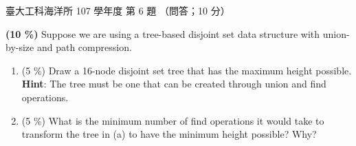 \begin{pastexam}[label={px:ntu-107-esoe-ds-06}]{臺大工科海洋所 107 學年度 第 6 題}
（問答；10 分）

\textbf{(10 \%)} Suppose we are using a tree-based disjoint set data structure with union-by-size and
path compression.
\begin{enumerate}[label=\alph*.]
\item (5 \%) Draw a 16-node disjoint set tree that has the maximum height possible. \textbf{Hint}: The
tree must be one that can be created through union and find operations.
\item (5 \%) What is the minimum number of find operations it would take to transform the tree in (a)
to have the minimum height possible? Why?
\end{enumerate}
\end{pastexam}

